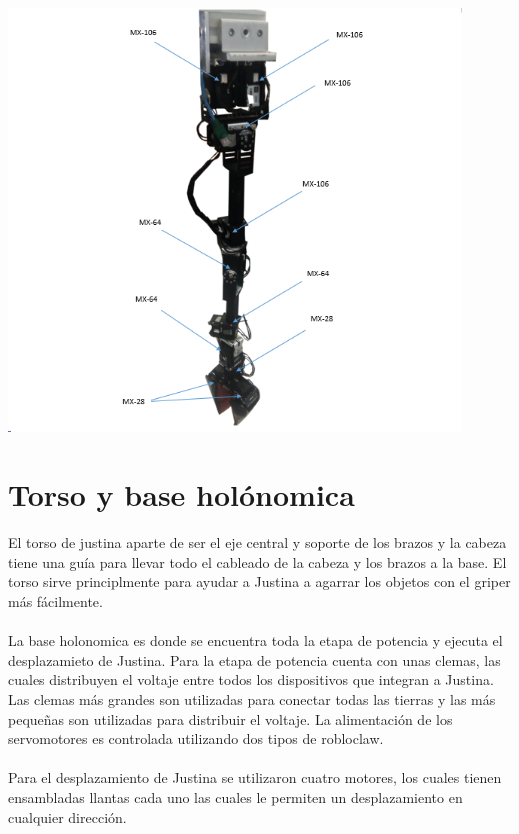 \documentclass[user_manual.tex]{subfiles}
\begin{document}
\begin{center}
\includegraphics[width=0.9\textwidth]{Figures/Hardware/Diagramas/Brazo.png}
\label{fig:Hardware:Diagramas:Justina:Brazo}
\end{center}
\section{Torso y base holónomica}
El torso de justina aparte de ser el eje central y soporte de los brazos y la cabeza tiene una guía para llevar todo el
cableado de la cabeza y los brazos a la base. El torso sirve principlmente para ayudar a Justina a agarrar los objetos con el griper más fácilmente. \\
\\
La base holonomica es donde se encuentra toda la etapa de potencia y ejecuta el desplazamieto de Justina. Para la etapa de potencia cuenta con unas clemas, las cuales distribuyen el voltaje entre todos los dispositivos que integran a Justina. Las clemas más grandes son utilizadas para conectar todas las tierras y las más pequeñas son utilizadas para distribuir el voltaje. La alimentación de los servomotores es controlada utilizando dos tipos
de robloclaw.\\
\\ Para el desplazamiento de Justina se utilizaron cuatro motores, los cuales tienen ensambladas llantas cada uno las cuales le permiten un desplazamiento en cualquier dirección.
\end{document}
